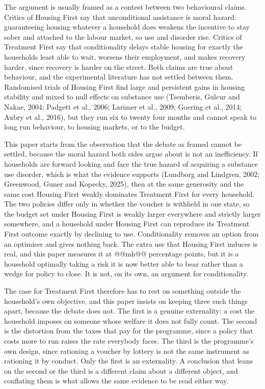 \documentclass[10pt]{article}
\begin{document}
The argument is usually framed as a contest between two behavioural claims.
Critics of Housing First say that unconditional assistance is moral hazard:
guaranteeing housing whatever a household does weakens the incentive to stay
sober and attached to the labour market, so use and disorder rise. Critics of
Treatment First say that conditionality delays stable housing for exactly the
households least able to wait, worsens their employment, and makes recovery
harder, since recovery is harder on the street. Both claims are true about
behaviour, and the experimental literature has not settled between them.
Randomised trials of Housing First find large and persistent gains in housing
stability and mixed to null effects on substance use (Tsemberis, Gulcur and
Nakae, 2004; Padgett et al., 2006; Larimer et al., 2009; Goering
et al., 2014; Aubry et al., 2016), but they run six to twenty four months and
cannot speak to long run behaviour, to housing markets, or to the budget.



This paper starts from the observation that the debate as framed cannot be
settled, because the moral hazard both sides argue about is not an inefficiency.
If households are forward looking and face the true hazard of acquiring a
substance use disorder, which is what the evidence supports (Lundborg and
Lindgren, 2002; Greenwood, Guner and Kopecky, 2025), then at the same generosity
and the same cost Housing First weakly dominates Treatment First for every
household. The two policies differ only in whether the voucher is withheld in one
state, so the budget set under Housing First is weakly larger everywhere and
strictly larger somewhere, and a household under Housing First can reproduce its
Treatment First outcome exactly by declining to use. Conditionality removes an
option from an optimiser and gives nothing back. The extra use that Housing First
induces is real, and this paper measures it at @@mh@@ percentage points, but it is
a household optimally taking a risk it is now better able to bear rather than a
wedge for policy to close. It is not, on its own, an argument for conditionality.



The case for Treatment First therefore has to rest on something outside the
household's own objective, and this paper insists on keeping three such things
apart, because the debate does not. The first is a genuine externality: a cost
the household imposes on someone whose welfare it does not fully count. The
second is the distortion from the taxes that pay for the programme, since a
policy that costs more to run raises the rate everybody faces. The third is the
programme's own design, since rationing a voucher by lottery is not the same
instrument as rationing it by conduct. Only the first is an externality. A
conclusion that leans on the second or the third is a different claim about a
different object, and conflating them is what allows the same evidence to be read
either way.
\end{document}

